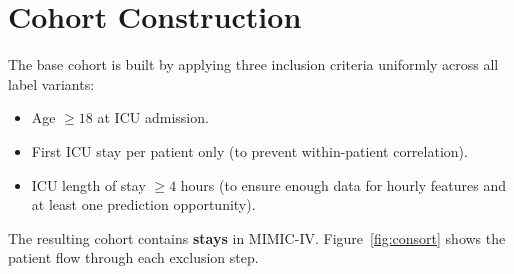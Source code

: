\section{Cohort Construction}

The base cohort is built by applying three inclusion criteria uniformly across
all label variants:

\begin{itemize}
    \item Age $\geq 18$ at ICU admission.
    \item First ICU stay per patient only (to prevent within-patient correlation).
    \item ICU length of stay $\geq 4$ hours (to ensure enough data for hourly
    features and at least one prediction opportunity).
\end{itemize}

The resulting cohort contains \textbf{\pcNStays{} stays} in MIMIC-IV.
Figure~\ref{fig:consort} shows the patient flow through each exclusion step.


